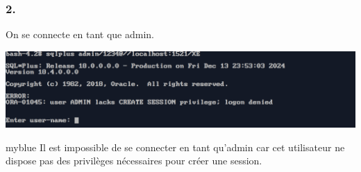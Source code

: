 \subsubsection*{2.}
On se connecte en tant que admin.



\begin{center}
    \includegraphics[width=\textwidth]{ScreenShot/Partie4/connect.png}
\end{center}

\begin{prettyBox}{}{myblue}
Il est impossible de se connecter en tant qu'admin car cet utilisateur ne dispose pas des privilèges nécessaires pour créer une session.
\end{prettyBox}
